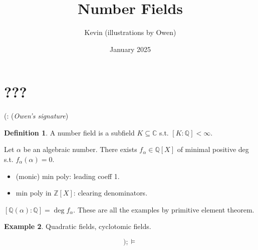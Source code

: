 \documentclass{article}
\title{Number Fields}
\author{Kevin (illustrations by Owen)}
\date{January 2025}
\theoremstyle{definition}
\newtheorem{defn}{Definition}[section]
\newtheorem{example}[defn]{Example}
\theoremstyle{remark}
\theoremstyle{plain}
\newcommand{\ZZ}{\mathbb{Z}}
\newcommand{\QQ}{\mathbb{Q}}
\newcommand{\CC}{\mathbb{C}}
\begin{document}
\maketitle
\section{???}
(: (\textit{Owen's signature})




\begin{defn}
    A number field is a subfield $K\subseteq \CC$ s.t. $[K:\QQ]<\infty$.
\end{defn}
Let $\alpha$ be an algebraic number. There exists $f_\alpha\in\QQ[X]$ of minimal positive deg s.t. $f_\alpha(\alpha)=0$. 
\begin{itemize}
    \item (monic) min poly: leading coeff 1.
    \item min poly in $\ZZ[X]$: clearing denominators.
\end{itemize}
$[\QQ(\alpha):\QQ]=\deg f_\alpha$. These are all the examples by primitive element theorem.
\begin{example}
    Quadratic fields, cyclotomic fields. 
\end{example}

\[);\models\tag{Owen's Signature}\]
\end{document}
